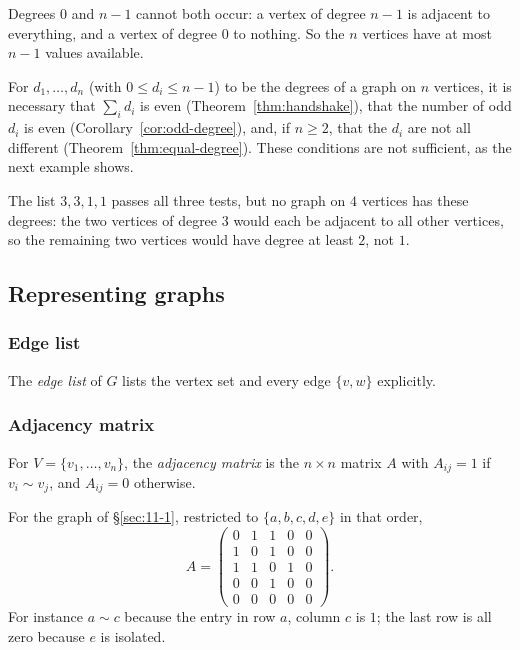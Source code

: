 \begin{note}
Degrees $0$ and $n-1$ cannot both occur: a vertex of degree $n-1$ is adjacent to everything, and a vertex of degree $0$ to nothing. So the $n$ vertices have at most $n-1$ values available.
\end{note}

\begin{note}
For $d_1,\dots,d_n$ (with $0\le d_i\le n-1$) to be the degrees of a graph on $n$ vertices, it is necessary that $\sum_i d_i$ is even (Theorem~\ref{thm:handshake}), that the number of odd $d_i$ is even (Corollary~\ref{cor:odd-degree}), and, if $n\ge2$, that the $d_i$ are not all different (Theorem~\ref{thm:equal-degree}). These conditions are not sufficient, as the next example shows.
\end{note}

\begin{example}
The list $3,3,1,1$ passes all three tests, but no graph on $4$ vertices has these degrees: the two vertices of degree $3$ would each be adjacent to all other vertices, so the remaining two vertices would have degree at least $2$, not $1$.
\end{example}

\subsection{Representing graphs}
\label{sec:11-4}

\subsubsection{Edge list}
\begin{definition}
The \emph{edge list} of $G$ lists the vertex set and every edge $\{v,w\}$ explicitly.
\end{definition}

\subsubsection{Adjacency matrix}
\begin{definition}
For $V=\{v_1,\dots,v_n\}$, the \emph{adjacency matrix} is the $n\times n$ matrix $A$ with $A_{ij}=1$ if $v_i\sim v_j$, and $A_{ij}=0$ otherwise.
\end{definition}

\begin{example}
For the graph of \S\ref{sec:11-1}, restricted to $\{a,b,c,d,e\}$ in that order,
\[
A =
\begin{pmatrix}
0 & 1 & 1 & 0 & 0 \\
1 & 0 & 1 & 0 & 0 \\
1 & 1 & 0 & 1 & 0 \\
0 & 0 & 1 & 0 & 0 \\
0 & 0 & 0 & 0 & 0
\end{pmatrix}.
\]
For instance $a\sim c$ because the entry in row $a$, column $c$ is $1$; the last row is all zero because $e$ is isolated.
\end{example}

